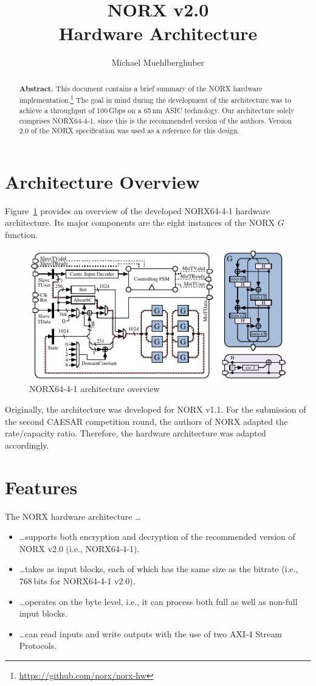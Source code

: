 \documentclass[%
 halfparskip
]{scrartcl}
\title{NORX v2.0\\Hardware Architecture}
\author{Michael Muehlberghuber}
\begin{document}
\maketitle

\begin{abstract}
  \textbf{Abstract.} This document contains a brief summary of the
  NORX hardware
  implementation.\footnote{\url{https://github.com/norx/norx-hw}} The
  goal in mind during the development of the architecture was to
  achieve a throughput of 100\,Gbps on a 65\,nm ASIC technology. Our
  architecture solely comprises \mbox{NORX64-4-1}, since this is the
  recommended version of the authors. Version 2.0 of the NORX
  specification was used as a reference for this design.
\end{abstract}


\section{Architecture Overview}

Figure~\ref{lbl:architecture} provides an overview of the developed
NORX64-4-1 hardware architecture. Its major components are the eight
instances of the NORX $G$ function.
%
\begin{figure}[h]
\centering\includegraphics[width=0.85\linewidth]{./figures/norx-arch.pdf}
\caption{NORX64-4-1 architecture overview}
\label{lbl:architecture}
\end{figure}
%
Originally, the architecture was developed for NORX v1.1. For the
submission of the second CAESAR competition round, the authors of NORX
adapted the rate/capacity ratio. Therefore, the hardware architecture
was adapted accordingly.

\section{Features}

The NORX hardware architecture \ldots
\begin{itemize}
\item \ldots supports both encryption and decryption of the
  recommended version of NORX v2.0 (i.e., NORX64-4-1).
\item \ldots takes as input blocks, each of which has the same size as
  the bitrate (i.e., 768\,bits for NORX64-4-1 v2.0).
\item \ldots operates on the byte level, i.e., it can process both
  full as well as non-full input blocks. 
\item \ldots can read inputs and write outputs with the use of two
  AXI-4 Stream Protocols.
\end{itemize}
\end{document}
